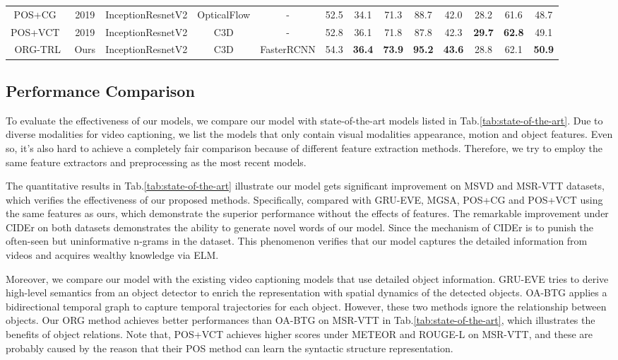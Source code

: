\documentclass[10pt,twocolumn,letterpaper]{article}
\begin{document}
\begin{table*}[]
\begin{center}
{\begin{tabular}{@{}c|c|ccc|cccc|cccc@{}}
			POS+CG~\cite{Wang_2019_ICCV} & 2019 & InceptionResnetV2 & OpticalFlow & - & 52.5 & 34.1 & 71.3 & 88.7 & 42.0 & 28.2 & 61.6 & 48.7 \\
			POS+VCT~\cite{Hou_2019_ICCV} & 2019 & InceptionResnetV2 & C3D & - & 52.8 & 36.1 & 71.8 & 87.8 & 42.3 & \textbf{29.7} & \textbf{62.8} & 49.1 \\ \midrule
			ORG-TRL & Ours & InceptionResnetV2 & C3D & FasterRCNN & 54.3 & \textbf{36.4} & \textbf{73.9} & \textbf{95.2} & \textbf{43.6} & 28.8 & 62.1 & \textbf{50.9} \\ \bottomrule
		\end{tabular}}
	\end{center}	
	\caption{Performance comparisons on MSVD and MSR-VTT benchmarks. The best results and corresponding features are listed.}
	\label{tab:state-of-the-art}
	\vspace{-0.5cm}
\end{table*}
\subsection{Performance Comparison}


To evaluate the effectiveness of our models, we compare our model with state-of-the-art models listed in Tab.\ref{tab:state-of-the-art}. Due to diverse modalities for video captioning, we list the models that only contain visual modalities \ie appearance, motion and object features. Even so, it's also hard to achieve a completely fair comparison because of different feature extraction methods. Therefore, we try to employ the same feature extractors and preprocessing as the most recent models.

The quantitative results in Tab.\ref{tab:state-of-the-art} illustrate our model gets significant improvement on MSVD and MSR-VTT datasets, which verifies the effectiveness of our proposed methods. Specifically, compared with GRU-EVE, MGSA, POS+CG and POS+VCT using the same features as ours, which demonstrate the superior performance without the effects of features. The remarkable improvement under CIDEr on both datasets demonstrates the ability to generate novel words of our model. Since the mechanism of CIDEr is to punish the often-seen but uninformative n-grams in the dataset. This phenomenon verifies that our model captures the detailed information from videos and acquires wealthy knowledge via ELM.

Moreover, we compare our model with the existing video captioning models that use detailed object information. GRU-EVE tries to derive high-level semantics from an object detector to enrich the representation with spatial dynamics of the detected objects. OA-BTG applies a bidirectional temporal graph to capture temporal trajectories for each object. However, these two methods ignore the relationship between objects. Our ORG method achieves better performances than OA-BTG on MSR-VTT in Tab.\ref{tab:state-of-the-art}, which illustrates the benefits of object relations. Note that, POS+VCT achieves higher scores under METEOR and ROUGE-L on MSR-VTT, and these are probably caused by the reason that their POS method can learn the syntactic structure representation.
\end{document}
